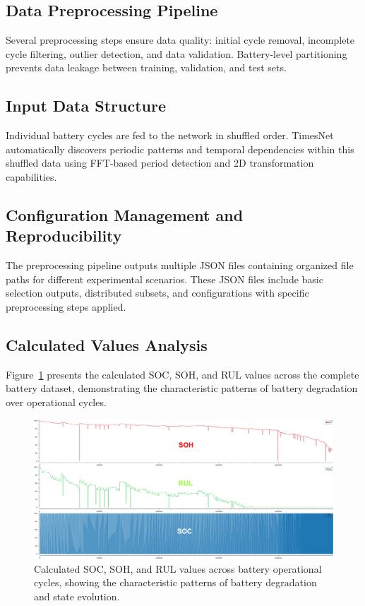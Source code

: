 \subsection{Data Preprocessing Pipeline}
\label{subsec:preprocessing_pipeline}

Several preprocessing steps ensure data quality: initial cycle removal, incomplete cycle filtering, outlier detection, and data validation. Battery-level partitioning prevents data leakage between training, validation, and test sets.

\subsection{Input Data Structure}
\label{subsec:input_data_structure}

Individual battery cycles are fed to the network in shuffled order. TimesNet automatically discovers periodic patterns and temporal dependencies within this shuffled data using FFT-based period detection and 2D transformation capabilities.

\subsection{Configuration Management and Reproducibility}
\label{subsec:config_management}

The preprocessing pipeline outputs multiple JSON files containing organized file paths for different experimental scenarios. These JSON files include basic selection outputs, distributed subsets, and configurations with specific preprocessing steps applied.
\subsection{Calculated Values Analysis}
\label{subsec:calculated_values_analysis}

Figure~\ref{fig:calculated_values} presents the calculated SOC, SOH, and RUL values across the complete battery dataset, demonstrating the characteristic patterns of battery degradation over operational cycles.

\begin{figure}[htbp]
\centering
\includegraphics[width=1.0\textwidth]{imgs/soc_soh_rul.png}
\caption{Calculated SOC, SOH, and RUL values across battery operational cycles, showing the characteristic patterns of battery degradation and state evolution.}
\label{fig:calculated_values}
\end{figure}

